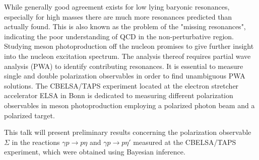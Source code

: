 \documentclass{scdpg}
\begin{document}
\begin{scAbstract}
{}
\scBeginText
While generally good agreement exists for low lying baryonic resonances, especially for high masses there are much more resonances predicted than actually found. This is also known as the problem of the "missing resonances", indicating the poor understanding of QCD in the non-perturbative region. Studying meson photoproduction off the nucleon promises to give further insight into the nucleon excitation spectrum. The analysis thereof requires partial wave analysis (PWA) to identify contributing resonances. It is essential to measure single and double polarization observables in order to find unambiguous PWA solutions. The CBELSA/TAPS experiment located at the electron stretcher accelerator ELSA in Bonn is dedicated to measuring different polarization observables in meson photoproduction employing a polarized photon beam and a polarized target. 

This talk will present preliminary results concerning the polarization observable $\Sigma$ in the reactions $\gamma p \to p \eta$ and $\gamma p \to p \eta'$ measured at the CBELSA/TAPS experiment, which were obtained using Bayesian inference.
\scEndText
{}

\end{scAbstract}
\end{document}
